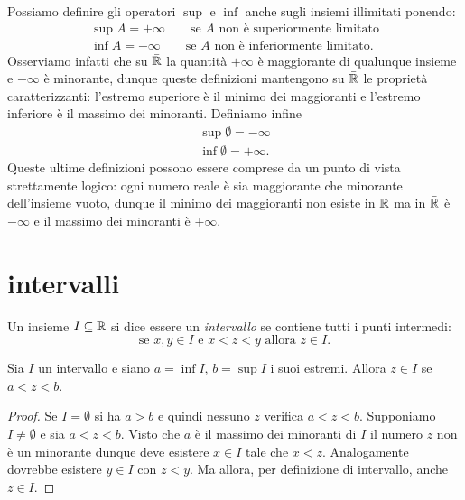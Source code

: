 Possiamo definire gli operatori $\sup$ e $\inf$
anche sugli insiemi illimitati ponendo:
\begin{align*}
  \sup A = +\infty \qquad \text{se $A$ non è superiormente limitato}\\
  \inf A = -\infty \qquad \text{se $A$ non è inferiormente limitato}.
\end{align*}
Osserviamo infatti che su $\bar {\mathbb R}$ la quantità $+\infty$
è maggiorante di qualunque insieme e $-\infty$ è minorante, dunque
queste definizioni mantengono su $\bar {\mathbb R}$ le proprietà caratterizzanti:
l'estremo superiore è il minimo dei maggioranti e
l'estremo inferiore è il massimo dei minoranti.
Definiamo infine
\begin{align*}
  \sup \emptyset = -\infty\\
  \inf \emptyset = +\infty.
\end{align*}
Queste ultime definizioni possono essere comprese da un punto di vista
strettamente logico: ogni numero reale è sia maggiorante che minorante
dell'insieme vuoto, dunque il minimo dei maggioranti non esiste in $\mathbb R$
ma in $\bar {\mathbb R}$ è $-\infty$
e il massimo dei minoranti è $+\infty$.

\section{intervalli}

\begin{definition}[intervallo]
Un insieme $I\subseteq \mathbb R$ si dice essere un \emph{intervallo}
se contiene tutti i punti intermedi:
\[
  \text{se $x, y \in I$ e $x<z<y$ allora $z \in I$.}
\]
\end{definition}
%
\begin{theorem}
Sia $I$ un intervallo e siano $a=\inf I$, $b=\sup I$
i suoi estremi. Allora
$z\in I$ se $a < z < b$.
\end{theorem}
%
\begin{proof}
Se $I=\emptyset$ si ha $a>b$ e quindi nessuno $z$ verifica $a<z<b$.
Supponiamo $I\neq \emptyset$ e
sia $a < z < b$.
Visto che $a$ è il massimo dei minoranti di $I$
il numero $z$ non è un minorante dunque
deve esistere $x \in I$ tale
che $x < z$. Analogamente dovrebbe esistere $y\in I$
con $z<y$.
Ma allora, per definizione di intervallo, anche $z\in I$.
\end{proof}

